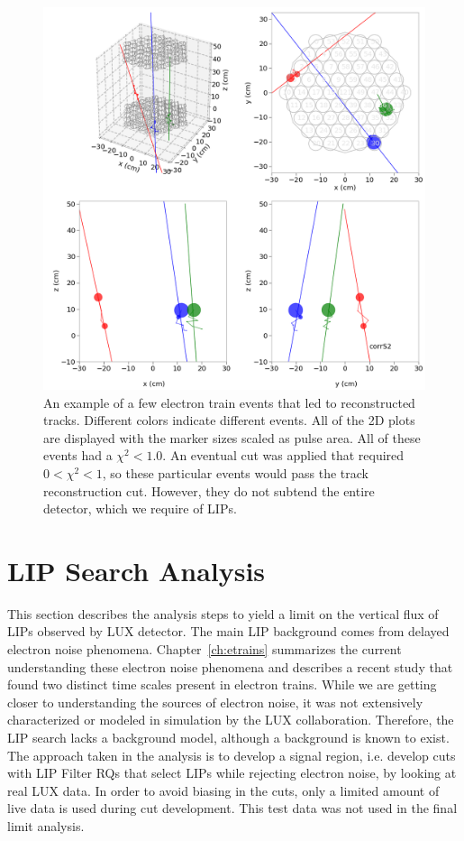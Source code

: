 \begin{figure}[htbp]
\begin{center}
\includegraphics[width=\textwidth]{figures/lips/tracks_etrain2.png}
\caption{An example of a few electron train events that led to reconstructed tracks. Different colors indicate different events. All of the 2D plots are displayed with the marker sizes scaled as pulse area.  All of these events had a $\chi^{2} < 1.0$. An eventual cut was applied that required $0 < \chi^{2} < 1$, so these particular events would pass the track reconstruction cut. However, they do not subtend the entire detector, which we require of \acs{LIP}s. }
\label{fig:tracks_etrain2}
\end{center}
\end{figure}


\FloatBarrier
\section{LIP Search Analysis}
This section describes the analysis steps to yield a limit on the vertical flux of \ac{LIP}s observed by \ac{LUX} detector. The main \ac{LIP} background comes from delayed electron noise phenomena. Chapter~\ref{ch:etrains} summarizes the current understanding these electron noise phenomena and describes a recent study that found two distinct time scales present in electron trains. While we are getting closer to understanding the sources of electron noise, it was not extensively characterized or modeled in simulation by the \ac{LUX} collaboration. Therefore, the \ac{LIP} search lacks a background model, although a background is known to exist. The approach taken in the analysis is to develop a signal region, i.e. develop cuts with \ac{LIP} Filter \ac{RQ}s that select \ac{LIP}s while rejecting electron noise, by looking at real \ac{LUX} data. In order to avoid biasing in the cuts, only a limited amount of live data is used during cut development. This test data was not used in the final limit analysis.

